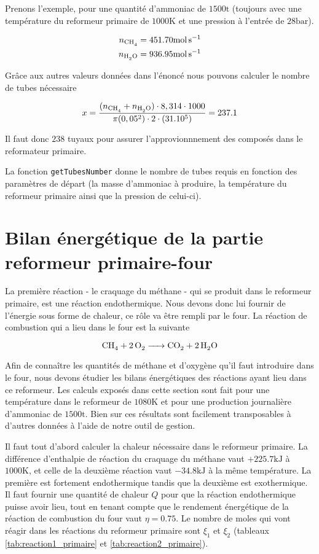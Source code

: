 Prenons l'exemple, pour une quantité d'ammoniac de $1500 \si{\tonne}$ 
(toujours avec une température du reformeur primaire de $1000\si{\kelvin}$
et une pression à l'entrée de $28\si{\bar}$).

\begin{align*}
	n_{\ce{CH4}} = 451.70 \si{\mole\per\second} \\
	n_{\ce{H2O}} = 936.95 \si{\mole\per\second}
\end{align*}

Grâce aux autres valeurs données dans l'énoncé 
nous pouvons calculer le nombre de tubes nécessaire 

\[
 x = \frac{(n_{\ce{CH4}}+n_{\ce{H2O}}) \cdot 8,314 \cdot 1000}
	{\pi (0,05^2) \cdot 2 \cdot (31.10^5)} = 237.1
\]

Il faut donc $238$ tuyaux pour assurer l'approvionnnement 
des composés dans le reformateur primaire.

La fonction \texttt{getTubesNumber} donne le
nombre de tubes requis en fonction des paramètres de départ (la masse d'ammoniac 
à produire, la température du reformeur primaire ainsi que la pression de celui-ci).

\section{Bilan énergétique de la partie reformeur primaire-four}

La première réaction - le craquage du méthane - qui se produit dans le reformeur primaire,
est une réaction endothermique. Nous devons donc lui fournir de l'énergie sous 
forme de chaleur, ce r\^ole va être rempli par le four. 
La réaction de combustion qui a lieu dans le four est la suivante

\[
	\ce{CH4 + 2O2 -> CO2 + 2H2O}
\]

Afin de connaître les quantités de méthane et d'oxygène qu'il faut
introduire dans le four, nous devons étudier les bilans énergétiques
des réactions ayant lieu dans ce reformeur. Les calculs exposés dans cette section 
sont fait pour une température dans le reformeur de $1080 \si{\kelvin}$
et pour une production journalière d'ammoniac de $1500 \si{\tonne}$. 
Bien sur ces résultats sont facilement transposables
à d'autres données à l'aide de notre outil de gestion.

Il faut tout d'abord calculer la chaleur nécessaire dans le reformeur primaire.
La différence d'enthalpie de réaction du craquage du méthane vaut $+225.7 \si{\kilo\joule}$
à $1000 \si{\kelvin}$, et celle de la deuxième réaction
vaut $-34.8 \si{\kilo\joule}$ à la même température.
La première est fortement endothermique tandis que la deuxième est exothermique.
Il faut fournir une quantité de chaleur $Q$ pour que la réaction endothermique
puisse avoir lieu, tout en tenant compte que le rendement énergétique de 
la réaction de combustion du four vaut $\eta = 0.75$.
Le nombre de moles qui vont réagir dans les réactions du reformeur primaire 
sont $\xi_1$ et $\xi_2$ (tableaux \ref{tab:reaction1_primaire} 
et \ref{tab:reaction2_primaire}).

